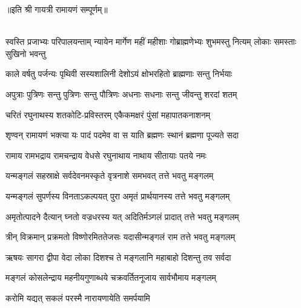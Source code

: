 ॥इति श्री गायत्री रामायणं सम्पूर्णम्॥

\mbox{}\\
\resetShloka
{}
\fourlineindentedshloka
{स्वस्ति प्रजाभ्यः परिपालयन्ताम्}
{न्यायेन मार्गेण महीं महीशाः}
{गोब्राह्मणेभ्यः शुभमस्तु नित्यम्}
{लोकाः समस्ताः सुखिनो भवन्तु}

\twolineshloka
{काले वर्षतु पर्जन्यः पृथिवी सस्यशालिनी}
{देशोऽयं क्षोभरहितो ब्राह्मणाः सन्तु निर्भयाः}

\twolineshloka
{अपुत्राः पुत्रिणः सन्तु पुत्रिणः सन्तु पौत्रिणः}
{अधनाः सधनाः सन्तु जीवन्तु शरदां शतम्}

\twolineshloka
{चरितं रघुनाथस्य शतकोटि-प्रविस्तरम्}
{एकैकमक्षरं पुंसां महापातकनाशनम्}

\twolineshloka
{शृण्वन् रामायणं भक्त्या यः पादं पदमेव वा}
{स याति ब्रह्मणः स्थानं ब्रह्मणा पूज्यते सदा}

\twolineshloka
{रामाय रामभद्राय रामचन्द्राय वेधसे}
{रघुनाथाय नाथाय सीतायाः पतये नमः}

\twolineshloka
{यन्मङ्गलं सहस्राक्षे सर्वदेवनमस्कृते}
{वृत्रनाशे समभवत् तत्ते भवतु मङ्गलम्}

\twolineshloka
{यन्मङ्गलं सुपर्णस्य विनताऽकल्पयत् पुरा}
{अमृतं प्रार्थयानस्य तत्ते भवतु मङ्गलम्}

\twolineshloka
{अमृतोत्पादने दैत्यान् घ्नतो वज्रधरस्य यत्}
{अदितिर्मञ्गलं प्रादात् तत्ते भवतु मङ्गलम्}

\twolineshloka
{त्रीन् विक्रमान् प्रक्रमतो विष्णोरमिततेजसः}
{यदासीन्मङ्गलं राम तत्ते भवतु मङ्गलम्}

\twolineshloka
{ऋषयः सागरा द्वीपा वेदा लोका दिशश्च ते}
{मङ्गलानि महाबाहो दिशन्तु तव सर्वदा}

\twolineshloka
{मङ्गलं कोसलेन्द्राय महनीयगुणाब्धये}
{चक्रवर्तितनूजाय सार्वभौमाय मङ्गलम्}

{करोमि यद्यत् सकलं परस्मै नारायणायेति समर्पयामि}
